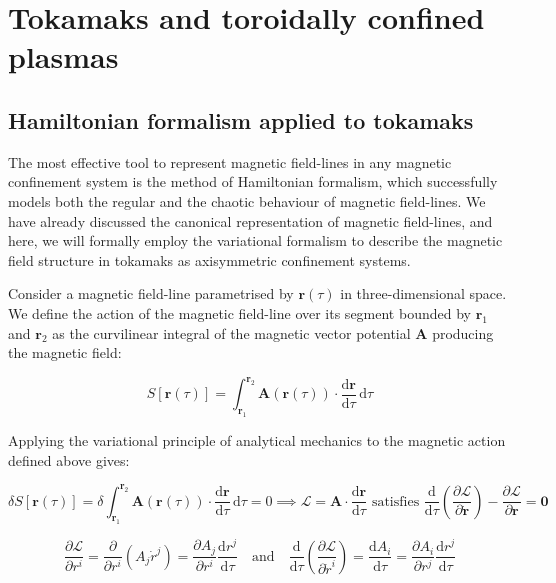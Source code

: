 \chapter{Tokamaks and toroidally confined plasmas}

\section{Hamiltonian formalism applied to tokamaks}

The most effective tool to represent magnetic field-lines in any magnetic confinement system is the method of Hamiltonian formalism, which successfully models both the regular and the chaotic behaviour of magnetic field-lines. We have already discussed the canonical representation of magnetic field-lines, and here, we will formally employ the variational formalism to describe the magnetic field structure in tokamaks as axisymmetric confinement systems.

\quad Consider a magnetic field-line parametrised by $\mathbf{r}(\tau)$ in three-dimensional space. We define the action of the magnetic field-line over its segment bounded by $\mathbf{r}_1$ and $\mathbf{r}_2$ as the curvilinear integral of the magnetic vector potential $\mathbf{A}$ producing the magnetic field:

\begin{equation}
    \label{eq-5-185}
    S[\mathbf{r}(\tau)]=\int_{\mathbf{r}_1}^{\mathbf{r}_2}\mathbf{A}(\mathbf{r}(\tau))\cdot\frac{\mathrm{d}\mathbf{r}}{\mathrm{d}\tau}\,\text{d}\tau
\end{equation}

Applying the variational principle of analytical mechanics to the magnetic action defined above gives:

\begin{equation}
    \delta S[\mathbf{r}(\tau)]=\delta\int_{\mathbf{r}_1}^{\mathbf{r}_2}\mathbf{A}(\mathbf{r}(\tau))\cdot\frac{\mathrm{d}\mathbf{r}}{\mathrm{d}\tau}\,\mathrm{d}\tau=0\implies\mathcal{L}=\mathbf{A}\cdot\frac{\mathrm{d}\mathbf{r}}{\mathrm{d}\tau}\text{ satisfies }\frac{\mathrm{d}}{\mathrm{d}\tau}\left(\frac{\partial\mathcal{L}}{\partial\dot{\mathbf{r}}}\right)-\frac{\partial\mathcal{L}}{\partial\mathbf{r}}=\mathbf{0}
\end{equation}

\begin{equation}
    \frac{\partial\mathcal{L}}{\partial r^i}=\frac{\partial}{\partial r^i}(A_j\dot{r}^j)=\frac{\partial A_j}{\partial r^i}\frac{\mathrm{d}r^j}{\mathrm{d}\tau}\quad\text{and}\quad\frac{\mathrm{d}}{\mathrm{d}\tau}\left(\frac{\partial\mathcal{L}}{\partial\dot{r}^i}\right)=\frac{\mathrm{d}A_i}{\mathrm{d}\tau}=\frac{\partial A_i}{\partial r^j}\frac{\mathrm{d}r^j}{\mathrm{d}\tau}
\end{equation}

